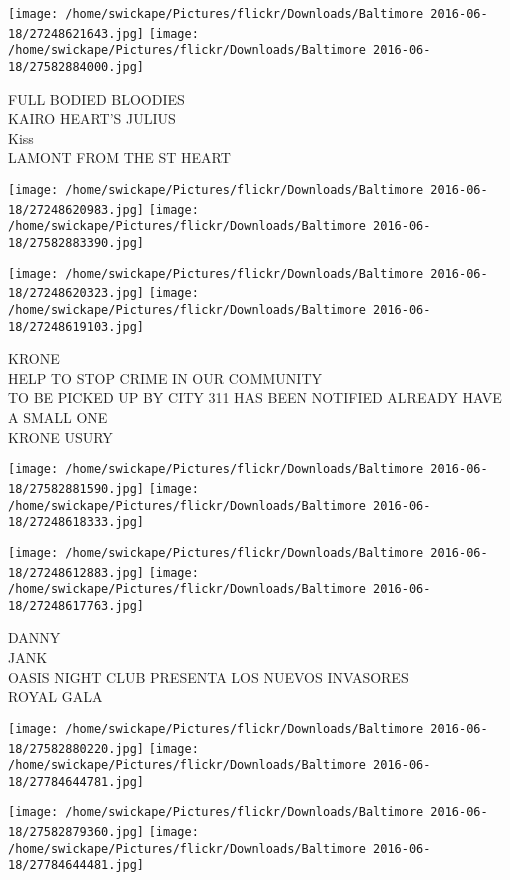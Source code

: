 \documentclass[10pt,letterpaper]{article}
\begin{document}
\texttt{[image: /home/swickape/Pictures/flickr/Downloads/Baltimore 2016-06-18/27248621643.jpg]}
\texttt{[image: /home/swickape/Pictures/flickr/Downloads/Baltimore 2016-06-18/27582884000.jpg]}

FULL BODIED BLOODIES\\
KAIRO HEART'S JULIUS\\
Kiss\\
LAMONT FROM THE ST HEART
\pagebreak

\texttt{[image: /home/swickape/Pictures/flickr/Downloads/Baltimore 2016-06-18/27248620983.jpg]}
\texttt{[image: /home/swickape/Pictures/flickr/Downloads/Baltimore 2016-06-18/27582883390.jpg]}

\texttt{[image: /home/swickape/Pictures/flickr/Downloads/Baltimore 2016-06-18/27248620323.jpg]}
\texttt{[image: /home/swickape/Pictures/flickr/Downloads/Baltimore 2016-06-18/27248619103.jpg]}

KRONE\\
HELP TO STOP CRIME IN OUR COMMUNITY\\
TO BE PICKED UP BY CITY 311 HAS BEEN NOTIFIED ALREADY HAVE A SMALL ONE\\
KRONE USURY
\pagebreak

\texttt{[image: /home/swickape/Pictures/flickr/Downloads/Baltimore 2016-06-18/27582881590.jpg]}
\texttt{[image: /home/swickape/Pictures/flickr/Downloads/Baltimore 2016-06-18/27248618333.jpg]}

\texttt{[image: /home/swickape/Pictures/flickr/Downloads/Baltimore 2016-06-18/27248612883.jpg]}
\texttt{[image: /home/swickape/Pictures/flickr/Downloads/Baltimore 2016-06-18/27248617763.jpg]}

DANNY\\
JANK\\
OASIS NIGHT CLUB PRESENTA LOS NUEVOS INVASORES\\
ROYAL GALA
\pagebreak

\texttt{[image: /home/swickape/Pictures/flickr/Downloads/Baltimore 2016-06-18/27582880220.jpg]}
\texttt{[image: /home/swickape/Pictures/flickr/Downloads/Baltimore 2016-06-18/27784644781.jpg]}

\texttt{[image: /home/swickape/Pictures/flickr/Downloads/Baltimore 2016-06-18/27582879360.jpg]}
\texttt{[image: /home/swickape/Pictures/flickr/Downloads/Baltimore 2016-06-18/27784644481.jpg]}
\end{document}
